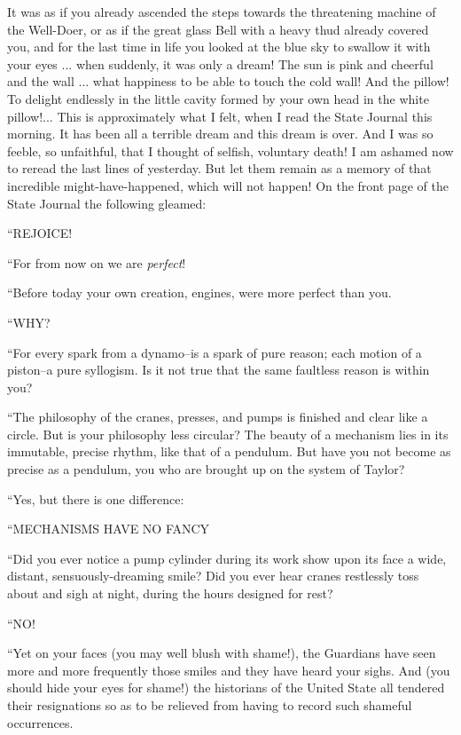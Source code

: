 \documentclass[11pt,openany]{book}
\begin{document}
It was as if you already ascended the steps towards the threatening machine of the Well-Doer, or as if the great glass Bell with a heavy thud already covered you, and for the last time in life you looked at the blue sky to swallow it with your eyes ... when suddenly, it was only a dream! The sun is pink and cheerful and the wall ... what happiness to be able to touch the cold wall! And the pillow! To delight endlessly in the little cavity formed by your own head in the white pillow!... This is approximately what I felt, when I read the State Journal this morning. It has been all a terrible dream and this dream is over. And I was so feeble, so unfaithful, that I thought of selfish, voluntary death! I am ashamed now to reread the last lines of yesterday. But let them remain as a memory of that incredible might-have-happened, which will not happen! On the front page of the State Journal the following gleamed:

``REJOICE!

``For from now on we are \emph{perfect}!

``Before today your own creation, engines, were more perfect than you.

``WHY?

``For every spark from a dynamo--is a spark of pure reason; each motion of a piston--a pure syllogism. Is it not true that the same faultless reason is within you?

``The philosophy of the cranes, presses, and pumps is finished and clear like a circle. But is your philosophy less circular? The beauty of a mechanism lies in its immutable, precise rhythm, like that of a pendulum. But have you not become as precise as a pendulum, you who are brought up on the system of Taylor?

``Yes, but there is one difference:

``MECHANISMS HAVE NO FANCY

``Did you ever notice a pump cylinder during its work show upon its face a wide, distant, sensuously-dreaming smile? Did you ever hear cranes restlessly toss about and sigh at night, during the hours designed for rest?

``NO!

``Yet on your faces (you may well blush with shame!), the Guardians have seen more and more frequently those smiles and they have heard your sighs. And (you should hide your eyes for shame!) the historians of the United State all tendered their resignations so as to be relieved from having to record such shameful occurrences.
\end{document}
